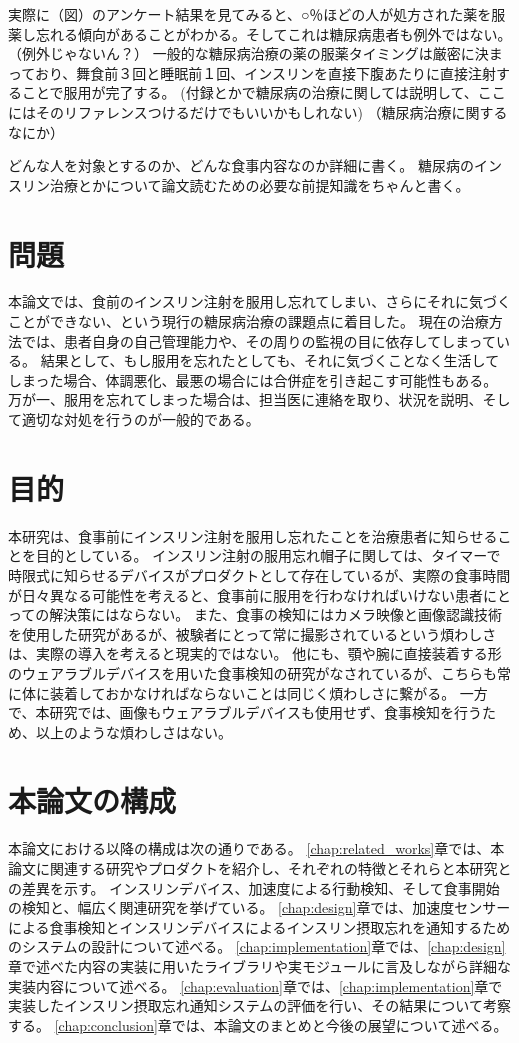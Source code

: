 実際に（図）のアンケート結果を見てみると、○％ほどの人が処方された薬を服薬し忘れる傾向があることがわかる。そしてこれは糖尿病患者も例外ではない。（例外じゃないん？）
一般的な糖尿病治療の薬の服薬タイミングは厳密に決まっており、舞食前３回と睡眠前１回、インスリンを直接下腹あたりに直接注射することで服用が完了する。
(付録とかで糖尿病の治療に関しては説明して、ここにはそのリファレンスつけるだけでもいいかもしれない)
（糖尿病治療に関するなにか）

どんな人を対象とするのか、どんな食事内容なのか詳細に書く。
糖尿病のインスリン治療とかについて論文読むための必要な前提知識をちゃんと書く。

\section{問題}
\label{section:problem}

本論文では、食前のインスリン注射を服用し忘れてしまい、さらにそれに気づくことができない、という現行の糖尿病治療の課題点に着目した。
現在の治療方法では、患者自身の自己管理能力や、その周りの監視の目に依存してしまっている。
結果として、もし服用を忘れたとしても、それに気づくことなく生活してしまった場合、体調悪化、最悪の場合には合併症を引き起こす可能性もある。
万が一、服用を忘れてしまった場合は、担当医に連絡を取り、状況を説明、そして適切な対処を行うのが一般的である。

\section{目的}
\label{section:purpose}

本研究は、食事前にインスリン注射を服用し忘れたことを治療患者に知らせることを目的としている。
インスリン注射の服用忘れ帽子に関しては、タイマーで時限式に知らせるデバイスがプロダクトとして存在しているが、実際の食事時間が日々異なる可能性を考えると、食事前に服用を行わなければいけない患者にとっての解決策にはならない。
また、食事の検知にはカメラ映像と画像認識技術を使用した研究があるが、被験者にとって常に撮影されているという煩わしさは、実際の導入を考えると現実的ではない。
他にも、顎や腕に直接装着する形のウェアラブルデバイスを用いた食事検知の研究がなされているが、こちらも常に体に装着しておかなければならないことは同じく煩わしさに繋がる。
一方で、本研究では、画像もウェアラブルデバイスも使用せず、食事検知を行うため、以上のような煩わしさはない。

\section{本論文の構成}
\label{section:structure}
本論文における以降の構成は次の通りである。
\ref{chap:related_works}章では、本論文に関連する研究やプロダクトを紹介し、それぞれの特徴とそれらと本研究との差異を示す。
インスリンデバイス、加速度による行動検知、そして食事開始の検知と、幅広く関連研究を挙げている。
\ref{chap:design}章では、加速度センサーによる食事検知とインスリンデバイスによるインスリン摂取忘れを通知するためのシステムの設計について述べる。
\ref{chap:implementation}章では、\ref{chap:design}章で述べた内容の実装に用いたライブラリや実モジュールに言及しながら詳細な実装内容について述べる。
\ref{chap:evaluation}章では、\ref{chap:implementation}章で実装したインスリン摂取忘れ通知システムの評価を行い、その結果について考察する。
\ref{chap:conclusion}章では、本論文のまとめと今後の展望について述べる。
